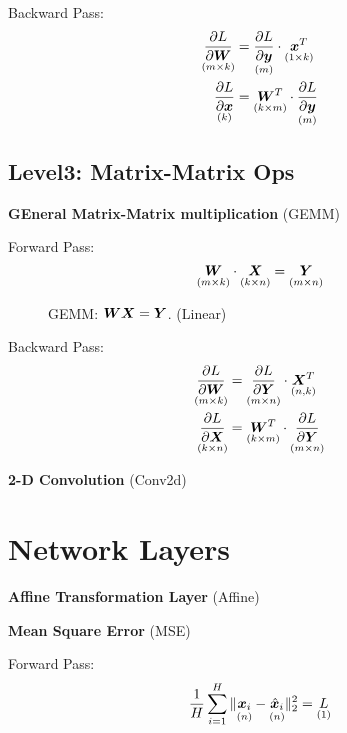 \documentclass[9pt,twocolumn,times]{article}
\begin{document}
	Backward Pass:
	\begin{align}
		\underset{(m\times k)}{\frac{\partial L}{\partial{\bm{W}}}} &=
		\underset{(m)}{\frac{\partial L}{\partial{\bm{y}}}} \cdot
		\underset{(1\times k)}{{\bm{x}}^T}\\
		\underset{(k)}{\frac{\partial L}{\partial{\bm{x}}}} &=
		\underset{(k\times m)}{{\bm{W}}^T} \cdot
		\underset{(m)}{\frac{\partial L}{\partial {\bm{y}}}}
	\end{align}

\subsection{Level3: Matrix-Matrix Ops}

	\textbf{GEneral Matrix-Matrix multiplication} (GEMM)

	Forward Pass:
	\begin{equation}
		\underset{(m\times k)}{{\bm{W}}} \cdot
		\underset{(k\times n)}{{\bm{X}}} =
		\underset{(m\times n)}{{\bm{Y}}}
	\end{equation}

	\begin{figure}[h]
		\centering
		\resizebox{0.618\columnwidth}{!}{%
			
		}
		\caption{GEMM: ${\bm{W}} {\bm{X}} = {\bm{Y}}$. (Linear)}
	\end{figure}

	Backward Pass:
	\begin{align}
		\underset{(m\times k)}{\frac{\partial L}{\partial{\bm{W}}}} &=
		\underset{(m\times n)}{\frac{\partial L}{\partial{\bm{Y}}}} \cdot
		\underset{(n,k)}{{\bm{X}}^T}\\
		\underset{(k\times n)}{\frac{\partial L}{\partial{\bm{X}}}} &=
		\underset{(k\times m)}{{\bm{W}}^T} \cdot
		\underset{(m\times n)}{\frac{\partial L}{\partial {\bm{Y}}}}
	\end{align}

	\textbf{2-D Convolution} (Conv2d)

\section{Network Layers}

	\textbf{Affine Transformation Layer} (Affine)

	\textbf{Mean Square Error} (MSE)

	Forward Pass:
	\begin{equation}
		\frac{1}{H} \sum_{i=1}^H
		\|\underset{(n)}{{\bm{x}}_i} - \underset{(n)}{\hat{{\bm{x}}}_i} \|_2^2
		= \underset{(1)}{L} 
	\end{equation}
\end{document}
